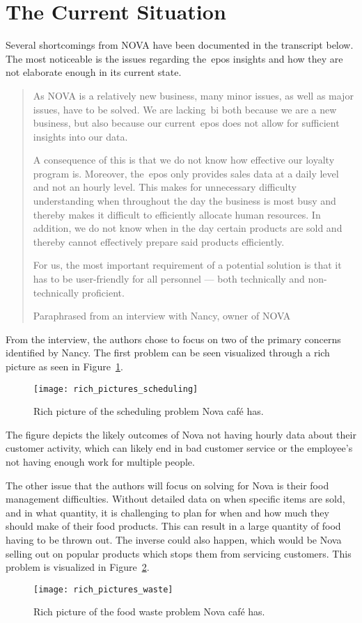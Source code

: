 \section{The Current Situation}\label{sec:the-current-situation}

Several shortcomings from NOVA have been documented in the transcript below.
The most noticeable is the issues regarding the~\acrfull{epos} insights and how they are not elaborate enough in its
current state.

\blockquote[Paraphrased from an interview with Nancy, owner of NOVA]{As NOVA is a relatively new business, many minor
issues, as well as major issues, have to be solved.
We are lacking~\acrshort{bi} both because we are a new business, but also because our current~\acrshort{epos} does not
allow for sufficient insights into our data.

A consequence of this is that we do not know how effective our loyalty program is.
Moreover, the~\acrshort{epos} only provides sales data at a daily level and not an hourly level.
This makes for unnecessary difficulty understanding when throughout the day the business is most busy and thereby makes
it difficult to efficiently allocate human resources.
In addition, we do not know when in the day certain products are sold and thereby cannot effectively prepare said
products efficiently.

For us, the most important requirement of a potential solution is that it has to be user-friendly for all personnel —
both technically and non-technically proficient.}

From the interview, the authors chose to focus on two of the primary concerns identified by Nancy.
The first problem can be seen visualized through a rich picture as seen in Figure~\ref{fig:pda-scheduling-problem}.

\begin{figure}[H]
    \centering
    \texttt{[image: rich\_pictures\_scheduling]}
    \caption{Rich picture of the scheduling problem Nova café has.}\label{fig:pda-scheduling-problem}
\end{figure}

The figure depicts the likely outcomes of Nova not having hourly data about their customer activity,
which can likely end in bad customer service or the employee's not having enough work for multiple people.

The other issue that the authors will focus on solving for Nova is their food management difficulties.
Without detailed data on when specific items are sold, and in what quantity, it is challenging to plan
for when and how much they should make of their food products.
This can result in a large quantity of food having to be thrown out.
The inverse could also happen, which would be Nova selling out on popular products which stops them
from servicing customers.
This problem is visualized in Figure~\ref{fig:pda-waste-problem}.

\begin{figure}[H]
    \centering
    \texttt{[image: rich\_pictures\_waste]}
    \caption{Rich picture of the food waste problem Nova café has.}\label{fig:pda-waste-problem}
\end{figure}
